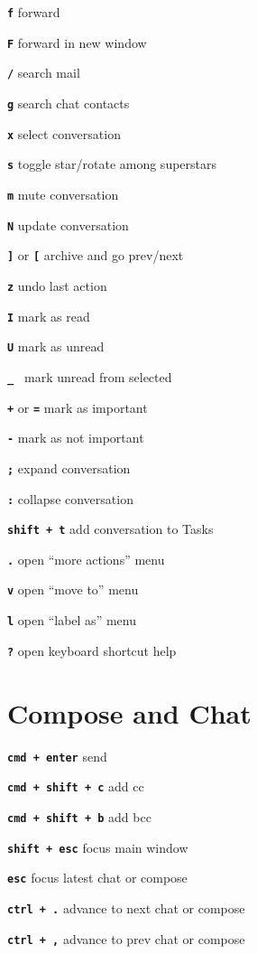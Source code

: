 \documentclass[11pt,letterpaper]{article}
\newcommand{\sck}[1]{\textbf{\texttt{#1}}}
\begin{document}
\sck{f} \dotfill forward

\sck{F} \dotfill forward in new window

\sck{/} \dotfill search mail	

\sck{g} \dotfill search chat contacts	

\sck{x} \dotfill select conversation

\sck{s} \dotfill toggle star/rotate among superstars

\sck{m} \dotfill mute conversation

\sck{N} \dotfill update conversation

\sck{]} or \sck{[} \dotfill archive and go prev/next

\sck{z} \dotfill undo last action

\sck{I} \dotfill mark as read

\sck{U} \dotfill mark as unread

\sck{\_ } \dotfill mark unread from selected

\sck{+} or \sck{=} \dotfill mark as important

\sck{-} \dotfill mark as not important

\sck{;} \dotfill expand conversation

\sck{:} \dotfill collapse conversation

\sck{shift + t} \dotfill add conversation to Tasks

\sck{.} \dotfill open ``more actions'' menu	

\sck{v} \dotfill open ``move to'' menu	

\sck{l} \dotfill open ``label as'' menu	

\sck{?} \dotfill open keyboard shortcut help
	


\section*{Compose and Chat}

\sck{cmd + enter} \dotfill send

\sck{cmd  + shift  + c} \dotfill add cc

\sck{cmd  + shift  + b} \dotfill add bcc

\sck{shift + esc} \dotfill focus main window

\sck{esc} \dotfill focus latest chat or compose

\sck{ctrl + .} \dotfill advance to next chat or compose

\sck{ctrl + ,} \dotfill advance to prev chat or compose
\end{document}
